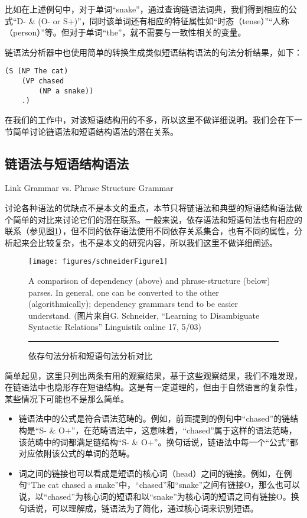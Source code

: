 比如在上述例句中，对于单词“snake”，通过查询链语法词典，我们得到相应的公式“D- \& (O- or S+)”，同时该单词还有相应的特征属性如“时态（tense）”“人称（person）”等。但对于单词“the”，就不需要与一致性相关的变量。

链语法分析器中也使用简单的转换生成类似短语结构语法的句法分析结果，如下：

{\tt\begin{small}\begin{lstlisting}
(S (NP The cat)
	(VP chased
	 	(NP a snake))
 	.)
\end{lstlisting}\end{small}}

在我们的工作中，对该短语结构用的不多，所以这里不做详细说明。我们会在下一节简单讨论链语法和短语结构语法的潜在关系。

\subsection{链语法与短语结构语法}{Link Grammar vs. Phrase Structure Grammar}

讨论各种语法的优缺点不是本文的重点，本节只将链语法和典型的短语结构语法做个简单的对比来讨论它们的潜在联系。一般来说，依存语法和短语句法也有相应的联系（参见图\ref{fig:Dependency-and-Phrase-Structure}），但不同的依存语法使用不同依存关系集合，也有不同的属性，分析起来会比较复杂，也不是本文的研究内容，所以我们这里不做详细阐述。

\begin{figure}

\begin{centering}
\texttt{[image: figures/schneiderFigure1]} 
\par\end{centering}

\caption{依存句法分析和短语句法分析对比\label{fig:Dependency-and-Phrase-Structure}}
A comparison of dependency (above) and phrase-structure (below) parses.
In general, one can be converted to the other (algorithmically); dependency
grammars tend to be easier understand.
(图片来自G. Schneider, ``Learning to Disambiguate Syntactic
Relations''  Linguistik online 17, 5/03)\\
 \rule[0.5ex]{1\columnwidth}{1pt} 
\end{figure}

简单起见，这里只列出两条有用的观察结果，基于这些观察结果，我们不难发现，在链语法中也隐形存在短语结构。这是有一定道理的，但由于自然语言的复杂性，某些情况下可能也不是那么简单。

\begin{itemize}
\item 链语法中的公式是符合语法范畴的。例如，前面提到的例句中“chased”的链结构是“S- \& O+”，在范畴语法中，这意味着，“chased”属于这样的语法范畴，该范畴中的词都满足链结构“S- \& O+”。换句话说，链语法中每一个“公式”都对应依附该公式的单词的范畴。 
\item 词之间的链接也可以看成是短语的核心词（head）之间的链接。例如，在例句“The cat chased a snake”中，“chased”和“snake”之间有链接O，那么也可以说，以“chased”为核心词的短语和以“snake”为核心词的短语之间有链接O。换句话说，可以理解成，链语法为了简化，通过核心词来识别短语。
\end{itemize}

